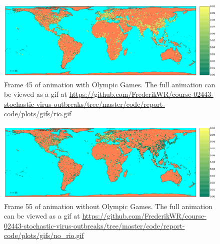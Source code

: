 \begin{figure}[H]
	\centering
	\includegraphics[width=1.0 \linewidth]{plots/gifs/frames/rio-45}
	\caption{Frame 45 of animation with Olympic Games. The full animation can be viewed as a gif at
		\url{https://github.com/FrederikWR/course-02443-stochastic-virus-outbreaks/tree/master/code/report-code/plots/gifs/rio.gif}}
\end{figure}

\begin{figure}[H]
	\centering
	\includegraphics[width=1.0 \linewidth]{plots/gifs/frames/noRio-55}
	\caption{Frame 55 of animation without Olympic Games. The full animation can be viewed as a gif at
		\url{https://github.com/FrederikWR/course-02443-stochastic-virus-outbreaks/tree/master/code/report-code/plots/gifs/no\_rio.gif}}
\end{figure}


